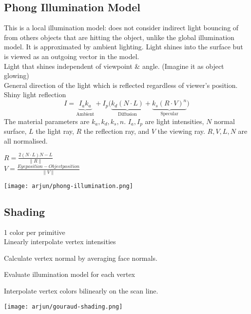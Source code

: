 \subsection*{Phong Illumination Model}
This is a local illumination model: does not consider indirect light bouncing of from others objects that are hitting the object, unlike the global illumination model. It is approximated by ambient lighting.
Light shines into the surface but is viewed as an outgoing vector in the model.\\
 Light that shines independent of viewpoint \& angle. (Imagine it as object glowing) \\
 General direction of the light which is reflected regardless of viewer's position.\\
 Shiny light reflection
$$I = \underbrace{I_ak_a }_\text{Ambient} + I_p \bigl( \underbrace{k_d(N \cdot L)}_\text{Diffusion} + \underbrace{k_s(R \cdot V)^n}_\text{Specular} \bigr)$$
The material parameters are $k_a, k_d, k_s, n$. $I_a, I_p$ are light intensities, $N$ normal surface, $L$ the light ray, $R$ the reflection ray, and $V$ the viewing ray. $R, V, L, N$ are all normalised. 

\begin{minipage}{0.6\columnwidth}
    $R = \frac{2(N \cdot L)N - L}{\lVert R \rVert} $ \\
$V = \frac{Eye position - Object position}{\lVert V \rVert} $
\end{minipage}
\begin{minipage}{0.4\columnwidth}
    \texttt{[image: arjun/phong-illumination.png]}
\end{minipage}

\subsection*{Shading}
 1 color per primitive \\
 Linearly interpolate vertex intensities
\begin{compactenum}
    \item Calculate vertex normal by averaging face normals.
    \item Evaluate illumination model for each vertex
    \item Interpolate vertex colors bilinearly on the scan line.
\end{compactenum}
\begin{center}
    \texttt{[image: arjun/gouraud-shading.png]}
\end{center}

